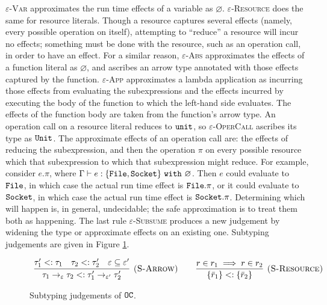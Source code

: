 \textsc{$\varepsilon$-Var} approximates the run time effects of a variable as $\varnothing$. \textsc{$\varepsilon$-Resource} does the same for resource literals. Though a resource captures several effects (namely, every possible operation on itself), attempting to ``reduce'' a resource will incur no effects; something must be done with the resource, such as an operation call, in order to have an effect. For a similar reason, \textsc{$\varepsilon$-Abs} approximates the effects of a function literal as $\varnothing$, and ascribes an arrow type annotated with those effects captured by the function. \textsc{$\varepsilon$-App} approximates a lambda application as incurring those effects from evaluating the subexpressions and the effects incurred by executing the body of the function to which the left-hand side evaluates. The effects of the function body are taken from the function's arrow type. An operation call on a resource literal reduces to $\mathtt{unit}$, so \textsc{$\varepsilon$-OperCall} ascribes its type as $\mathtt{Unit}$.
The approximate effects of an operation call are: the effects of reducing the subexpression, and then the operation $\pi$ on every possible resource which that subexpression to which that subexpression might reduce. For example, consider $e.\pi$, where $\Gamma \vdash e: \{ \mathtt{File, Socket} \}~\mathtt{with}~ \varnothing$. Then $e$ could evaluate to $\mathtt{File}$, in which case the actual run time effect is $\mathtt{File}.\pi$, or it could evaluate to $\mathtt{Socket}$, in which case the actual run time effect is $\mathtt{Socket.\pi}$. Determining which will happen is, in general, undecidable; the safe approximation is to treat them both as happening. The last rule \textsc{$\varepsilon$-Subsume} produces a new judgement by widening the type or approximate effects on an existing one. Subtyping judgements are given in Figure \ref{fig:opercalc_subtype_rules}.


\begin{figure}[h]
\vspace{-5pt}

\fbox{$\tau <: \tau$}

\[
\begin{array}{c}

\infer[\textsc{(S-Arrow)}]
	{ \tau_1 \rightarrow_{\varepsilon} \tau_2 <: \tau_1' \rightarrow_{\varepsilon'} \tau_2' }
	{ \tau_1' <: \tau_1 & \tau_2 <: \tau_2' & \varepsilon \subseteq \varepsilon' }
	\hspace{5ex}
\infer[\textsc{(S-Resource)}]
	{ \{ \bar r_1 \} <: \{ \bar r_2 \} }
	{ r \in r_1 \implies r \in r_2 }

\end{array}
\]

\vspace{-7pt}
\caption{Subtyping judgements of $\mathtt{OC}$.}
\label{fig:opercalc_subtype_rules}
\end{figure}

